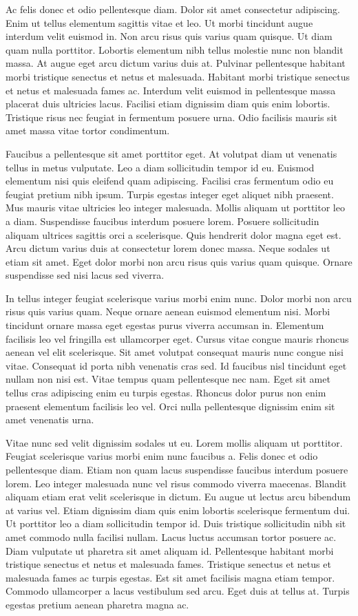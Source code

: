 \documentclass[11pt,a4paper]{article}
\begin{document}
Ac felis donec et odio pellentesque diam. Dolor sit amet consectetur adipiscing. Enim ut tellus elementum sagittis vitae et leo. Ut morbi tincidunt augue interdum velit euismod in. Non arcu risus quis varius quam quisque. Ut diam quam nulla porttitor. Lobortis elementum nibh tellus molestie nunc non blandit massa. At augue eget arcu dictum varius duis at. Pulvinar pellentesque habitant morbi tristique senectus et netus et malesuada. Habitant morbi tristique senectus et netus et malesuada fames ac. Interdum velit euismod in pellentesque massa placerat duis ultricies lacus. Facilisi etiam dignissim diam quis enim lobortis. Tristique risus nec feugiat in fermentum posuere urna. Odio facilisis mauris sit amet massa vitae tortor condimentum.

Faucibus a pellentesque sit amet porttitor eget. At volutpat diam ut venenatis tellus in metus vulputate. Leo a diam sollicitudin tempor id eu. Euismod elementum nisi quis eleifend quam adipiscing. Facilisi cras fermentum odio eu feugiat pretium nibh ipsum. Turpis egestas integer eget aliquet nibh praesent. Mus mauris vitae ultricies leo integer malesuada. Mollis aliquam ut porttitor leo a diam. Suspendisse faucibus interdum posuere lorem. Posuere sollicitudin aliquam ultrices sagittis orci a scelerisque. Quis hendrerit dolor magna eget est. Arcu dictum varius duis at consectetur lorem donec massa. Neque sodales ut etiam sit amet. Eget dolor morbi non arcu risus quis varius quam quisque. Ornare suspendisse sed nisi lacus sed viverra.

In tellus integer feugiat scelerisque varius morbi enim nunc. Dolor morbi non arcu risus quis varius quam. Neque ornare aenean euismod elementum nisi. Morbi tincidunt ornare massa eget egestas purus viverra accumsan in. Elementum facilisis leo vel fringilla est ullamcorper eget. Cursus vitae congue mauris rhoncus aenean vel elit scelerisque. Sit amet volutpat consequat mauris nunc congue nisi vitae. Consequat id porta nibh venenatis cras sed. Id faucibus nisl tincidunt eget nullam non nisi est. Vitae tempus quam pellentesque nec nam. Eget sit amet tellus cras adipiscing enim eu turpis egestas. Rhoncus dolor purus non enim praesent elementum facilisis leo vel. Orci nulla pellentesque dignissim enim sit amet venenatis urna.

Vitae nunc sed velit dignissim sodales ut eu. Lorem mollis aliquam ut porttitor. Feugiat scelerisque varius morbi enim nunc faucibus a. Felis donec et odio pellentesque diam. Etiam non quam lacus suspendisse faucibus interdum posuere lorem. Leo integer malesuada nunc vel risus commodo viverra maecenas. Blandit aliquam etiam erat velit scelerisque in dictum. Eu augue ut lectus arcu bibendum at varius vel. Etiam dignissim diam quis enim lobortis scelerisque fermentum dui. Ut porttitor leo a diam sollicitudin tempor id. Duis tristique sollicitudin nibh sit amet commodo nulla facilisi nullam. Lacus luctus accumsan tortor posuere ac. Diam vulputate ut pharetra sit amet aliquam id. Pellentesque habitant morbi tristique senectus et netus et malesuada fames. Tristique senectus et netus et malesuada fames ac turpis egestas. Est sit amet facilisis magna etiam tempor. Commodo ullamcorper a lacus vestibulum sed arcu. Eget duis at tellus at. Turpis egestas pretium aenean pharetra magna ac.
\end{document}
